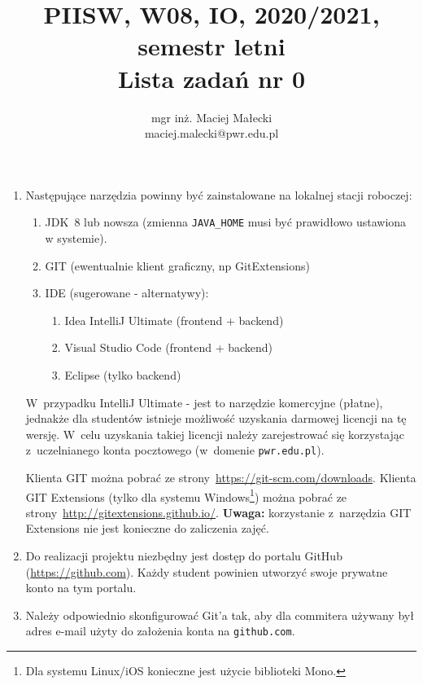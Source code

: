 \documentclass[12pt]{article}
\title{PIISW, W08, IO, 2020/2021, semestr letni\\Lista zadań nr 0}
\author{mgr inż. Maciej Małecki\\\small{maciej.malecki@pwr.edu.pl}}
\begin{document}
    \maketitle

    \begin{enumerate}
        \item Następujące narzędzia powinny być zainstalowane na lokalnej stacji roboczej:
            \begin{enumerate}
                \item JDK~8 lub nowsza (zmienna \texttt{JAVA\_HOME} musi być prawidłowo ustawiona w systemie).
                \item GIT (ewentualnie klient graficzny, np GitExtensions)
                \item IDE (sugerowane - alternatywy):
                    \begin{enumerate}
                        \item Idea IntelliJ Ultimate (frontend + backend)
                        \item Visual Studio Code (frontend + backend)
                        \item Eclipse (tylko backend)
                    \end{enumerate}
            \end{enumerate}
            
            W~przypadku IntelliJ Ultimate - jest to narzędzie komercyjne (płatne), jednakże dla studentów istnieje możliwość uzyskania darmowej licencji na tę wersję. W~celu uzyskania takiej licencji należy zarejestrować się korzystając z~uczelnianego konta pocztowego (w~domenie \texttt{pwr.edu.pl}).

            Klienta GIT można pobrać ze strony~\url{https://git-scm.com/downloads}. Klienta GIT Extensions (tylko dla systemu Windows\footnote{Dla systemu Linux/iOS konieczne jest użycie biblioteki Mono.}) można pobrać ze strony~\url{http://gitextensions.github.io/}. \textbf{Uwaga:} korzystanie z~narzędzia GIT Extensions nie jest konieczne do zaliczenia zajęć.

        \item Do realizacji projektu niezbędny jest dostęp do portalu GitHub (\url{https://github.com}). Każdy student powinien utworzyć swoje prywatne konto na tym portalu.

        \item Należy odpowiednio skonfigurować Git’a tak, aby dla commitera używany był adres e-mail użyty do założenia konta na \texttt{github.com}.


\end{enumerate}
\end{document}
